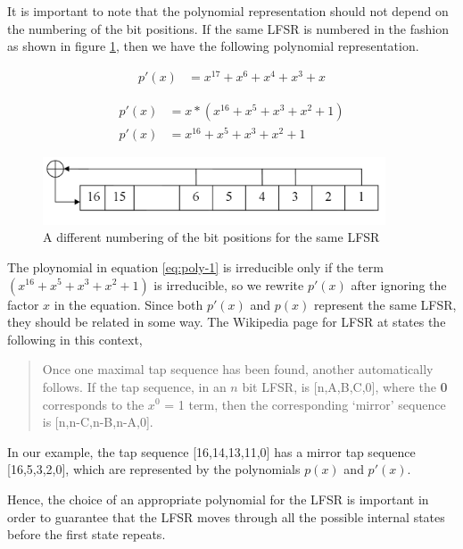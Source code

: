 It is important to note that the polynomial representation should not depend on the numbering of the bit positions. If the same LFSR is numbered in the fashion as shown in figure \ref{fig:lfsr-example2}, then we have the following polynomial representation.

\begin{align*}
p'(x) &= x^{17} + x^{6} + x^{4} + x^{3} + x
\end{align*}

\begin{align}
\label{eq:poly-1} p'(x) &= x*(x^{16} + x^{5} + x^{3} + x^{2} + 1)\\
\label{eq:poly-2} p'(x) &= x^{16} + x^{5} + x^{3} + x^{2} + 1
\end{align}


\begin{figure}[ht!]
	\centering
		\includegraphics[width=4in]{./figures/lfsr-example-reverse.PNG}
	\caption{A different numbering of the bit positions for the same LFSR}	
	\label{fig:lfsr-example2}
\end{figure}

The ploynomial in equation \ref{eq:poly-1} is irreducible only if the term $(x^{16} + x^{5} + x^{3} + x^{2} + 1)$ is irreducible, so we rewrite $p'(x)$ after ignoring the factor $x$ in the equation. Since both $p'(x)$ and $p(x)$ represent the same LFSR, they should be related in some way. The Wikipedia page for LFSR at \cite{lfsr-wiki} states the following in this context,

\begin{quote}
\footnotesize{
Once one maximal tap sequence has been found, another automatically follows. If the tap sequence, in an $n$ bit LFSR, is [n,A,B,C,0], where the \textbf{0} corresponds to the $x^0$ = 1 term, then the corresponding `mirror' sequence is [n,n-C,n-B,n-A,0].}
\end{quote}

In our example, the tap sequence [16,14,13,11,0] has a mirror tap sequence [16,5,3,2,0], which are represented by the polynomials $p(x)$ and $p'(x)$.

Hence, the choice of an appropriate polynomial for the LFSR is important in order to guarantee that the LFSR moves through all the possible internal states before the first state repeats.

